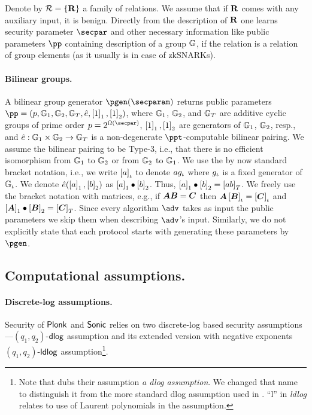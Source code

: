 \documentclass[runningheads,10pt]{llncs}
\let\spvec\vec
\let\vec\accentvec
\let\spvec\vec
\let\vec\spvec
\def\vec#1{\mathchoice{\mbox{\boldmath$\displaystyle#1$}}
  {\mbox{\boldmath$\textstyle#1$}} {\mbox{\boldmath$\scriptstyle#1$}}
  {\mbox{\boldmath$\scriptscriptstyle#1$}}}
\begin{document}
Denote by $\mathcal{R} = \{\mathbf{R}\}$ a family of relations. We assume that if
$\mathbf{R}$ comes with any auxiliary input, it is benign. Directly from the
description of $\mathbf{R}$ one learns security parameter $\secpar$ and other
necessary information like public parameters $\pp$ containing description of a
group $\mathbb{G}$, if the relation is a relation of group elements (as it usually is
in case of zkSNARKs).

\paragraph{Bilinear groups.}
A bilinear group generator $\pgen (\secparam)$ returns public parameters $ \pp =
(p, \GRP_1, \GRP_2, \GRP_T, \pair, \gone{1}, \gtwo{1})$, where $\mathbb{G}_1$,
$\mathbb{G}_2$, and $\mathbb{G}_T$ are additive cyclic groups of prime order $p = 2^{\Omega
  (\secpar)}$, $\left[1\right]_{1}, \left[1\right]_{2}$ are generators of $\mathbb{G}_1$, $\mathbb{G}_2$, resp.,
and $\hat{e}: \mathbb{G}_1 \times \mathbb{G}_2 \to \mathbb{G}_T$ is a non-degenerate
$\ppt$-computable bilinear pairing. We assume the bilinear pairing to be Type-3,
i.e., that there is no efficient isomorphism from $\mathbb{G}_1$ to $\mathbb{G}_2$ or from
$\mathbb{G}_2$ to $\mathbb{G}_1$. We use the by now standard bracket notation, i.e., we
write $\left[a\right]_{\iota}$ to denote $a g_{\iota}$ where $g_{\iota}$ is a fixed generator
of $\mathbb{G}_{\iota}$. We denote $\hat{e} (\left[a\right]_{1}, \left[b\right]_{2})$ as $\left[a\right]_{1} \bullet
\left[b\right]_{2}$. Thus, $\left[a\right]_{1} \bullet \left[b\right]_{2} = \left[a b\right]_{T}$. We freely use the
bracket notation with matrices, e.g., if $\vec{A} \vec{B} = \vec{C}$ then
$\vec{A} \grpgi{\vec{B}} = \grpgi{\vec{C}}$ and $\gone{\vec{A}}\bullet
\gtwo{\vec{B}} = \gtar{\vec{C}}$. Since every algorithm $\adv$ takes as input
the public parameters we skip them when describing $\adv$'s input. Similarly, we
do not explicitly state that each protocol starts with generating these
parameters by $\pgen$.

\subsection{Computational assumptions.}

\paragraph{Discrete-log assumptions.}
Security of $\textnormal{\textsf{Plonk}}$ and ${\textnormal{\textsf{Sonic}}}$ relies on two discrete-log based security
assumptions---$(q_1, q_2)$-$\mathsf{dlog}$ assumption and its extended version with negative
exponents $(q_1, q_2)$-$\mathsf{ldlog}$ assumption\footnote{Note that
  \cite{CCS:MBKM19} dubs their assumption \emph{a dlog assumption}. We changed
  that name to distinguish it from the more standard dlog assumption used in
  \cite{EPRINT:GabWilCio19}. ``l'' in \emph{ldlog} relates to use of Laurent
  polynomials in the assumption.}.
\end{document}

